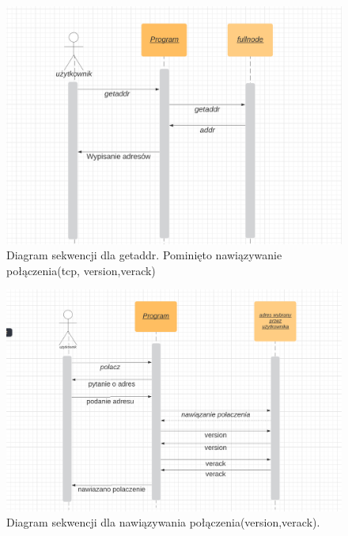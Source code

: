 \documentclass[a4paper,polish,12pt]{article}
\begin{document}
\begin{figure}

\caption{Diagram sekwencji dla getaddr. Pominięto nawiązywanie połączenia(tcp, version,verack)}
\label{zdj:sek:getaddr}
\centering
\includegraphics[width=\textwidth]{zdjecia/sekwencjiGetAddr}
\end{figure}

\begin{figure}

\caption{Diagram sekwencji dla nawiązywania połączenia(version,verack).}
\label{zdj:sek:version}
\centering
\includegraphics[width=\textwidth]{zdjecia/sekwencjiVersion}
\end{figure}
\end{document}
